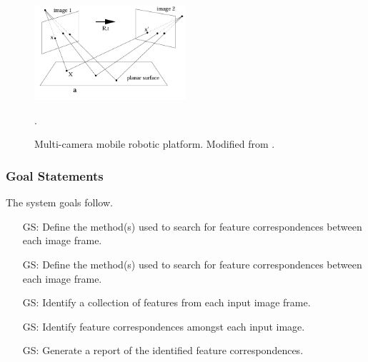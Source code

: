 \documentclass[12pt]{article}
\newcounter{goalnum} %
\begin{document}
\begin{figure}[ht!]
  \begin{center}
  \centering\includegraphics[width=0.5\textwidth]{Images/MULTIVIEW.png}
  \caption{Multi-camera mobile robotic platform. 
  Modified from \cite{Hartley_Zisserman}.}.
  \label{MV_HZ}
  \end{center}
\end{figure}



\subsubsection{Goal Statements}
\noindent The system goals follow.

\begin{itemize}

  \item[GS\refstepcounter{goalnum}\thegoalnum \label{define_features}:]
    Define the method(s) used to search for feature correspondences between each image frame.
    
  \item[GS\refstepcounter{goalnum}\thegoalnum \label{compare_features}:]
    Define the method(s) used to search for feature correspondences between each image frame.
  
  \item[GS\refstepcounter{goalnum}\thegoalnum \label{identify_features}:]
    Identify a collection of features from each input image frame. 
  
  \item[GS\refstepcounter{goalnum}\thegoalnum \label{identify_matches}:] 
    Identify feature correspondences amongst each input image.
  
  \item[GS\refstepcounter{goalnum}\thegoalnum \label{report_matches}:]
    Generate a report of the identified feature correspondences.
    
\end{itemize}
\end{document}
